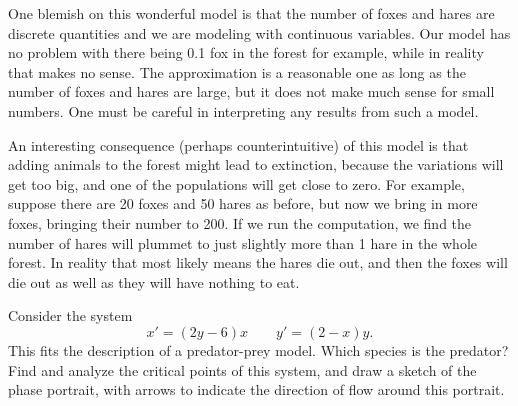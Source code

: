 \documentclass{ximera}
\begin{document}
One blemish on this wonderful model is that the number of foxes and hares are discrete quantities and we are modeling with continuous variables.  Our model has no problem with there being 0.1 fox in the forest for example, while in reality that makes no sense.  The approximation is a reasonable one as long as the number of foxes and hares are large, but it does not make much sense for small numbers.  One must be careful in interpreting any results from such a model.

An interesting consequence (perhaps counterintuitive) of this model is that adding animals to the forest might lead to extinction, because the variations will get too big, and one of the populations will get close to zero.  For example, suppose there are 20 foxes and 50 hares as before, but now we bring in more foxes, bringing their number to 200.  If we run the computation, we find the number of hares will plummet to just slightly more than 1 hare in the whole forest.  In reality that most likely means the hares die out, and then the foxes will die out as well as they will have nothing to eat.

\begin{example} \label{example:PredPreyNC}
    Consider the system
    \begin{equation*}
        x' = (2y - 6)x \qquad y' = (2 - x)y.
    \end{equation*}
    This fits the description of a predator-prey model. Which species is the predator? Find and analyze the critical points of this system, and draw a sketch of the phase portrait, with arrows to indicate the direction of flow around this portrait.
\end{example}
\end{document}
